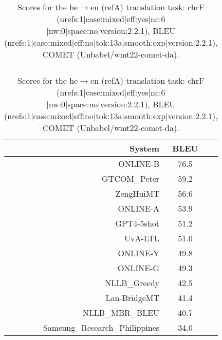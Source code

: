 \documentclass[11pt]{article}
\begin{document}
\begin{table}
\begin{subtable}[t]{0.33\textwidth}
\begin{tabular}{rcc}
\end{tabular} 
\end{subtable} 
\begin{subtable}[t]{0.33\textwidth}
\begin{tabular}{rcc}
\toprule 
System  & BLEU \\ 
\midrule 
\rowcolor{ashgrey} ONLINE-B  & 76.5 \\ 
\rowcolor{ashgrey} GTCOM\_Peter  & 59.2 \\ 
\rowcolor{ashgrey} ZengHuiMT  & 56.6 \\ 
\rowcolor{ashgrey} ONLINE-A  & 53.9 \\ 
\rowcolor{ashgrey} GPT4-5shot  & 51.2 \\ 
UvA-LTL  & 51.0 \\ 
\rowcolor{ashgrey} ONLINE-Y  & 49.8 \\ 
\rowcolor{ashgrey} ONLINE-G  & 49.3 \\ 
\rowcolor{ashgrey} NLLB\_Greedy & 42.5 \\ 
\rowcolor{ashgrey} Lan-BridgeMT  & 41.4 \\ 
\rowcolor{ashgrey} NLLB\_MBR\_BLEU  & 40.7 \\ 
Samsung\_Research\_Philippines  & 34.0 \\ 
\bottomrule 
\end{tabular} 
\end{subtable} 
 
\caption{Scores for the he$\rightarrow$en (refA) translation task: chrF (nrefs:1|case:mixed|eff:yes|nc:6 |nw:0|space:no|version:2.2.1), 
BLEU (nrefs:1|case:mixed|eff:no|tok:13a|smooth:exp|version:2.2.1), COMET (Unbabel/wmt22-comet-da).} 
\end{table} 
\end{document}
